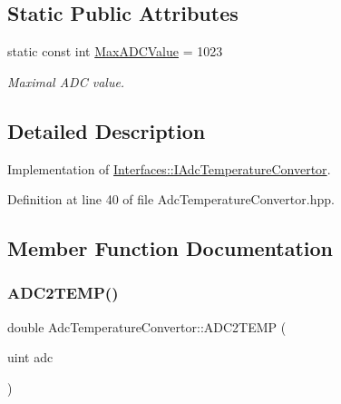 \subsection*{Static Public Attributes}
\begin{DoxyCompactItemize}
\item 
\mbox{\label{class_adc_temperature_convertor_a48ae20f44ed7ab7a1f6bbfab219fc6f8}} 
static const int \hyperlink{class_adc_temperature_convertor_a48ae20f44ed7ab7a1f6bbfab219fc6f8}{Max\+A\+D\+C\+Value} = 1023
\begin{DoxyCompactList}\small\item\em Maximal A\+DC value. \end{DoxyCompactList}\end{DoxyCompactItemize}


\subsection{Detailed Description}
Implementation of \hyperlink{class_interfaces_1_1_i_adc_temperature_convertor}{Interfaces\+::\+I\+Adc\+Temperature\+Convertor}. 

Definition at line 40 of file Adc\+Temperature\+Convertor.\+hpp.



\subsection{Member Function Documentation}
\mbox{\label{class_adc_temperature_convertor_a3ee4549435400d9ed319fd5fdb83c97f}} 
\subsubsection{\texorpdfstring{A\+D\+C2\+T\+E\+M\+P()}{ADC2TEMP()}}
{\footnotesize\ttfamily double Adc\+Temperature\+Convertor\+::\+A\+D\+C2\+T\+E\+MP (\begin{DoxyParamCaption}\item[{uint}]{adc }\end{DoxyParamCaption})\hspace{0.3cm}{\ttfamily [virtual]}}



